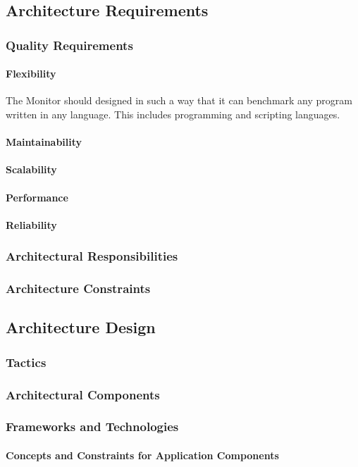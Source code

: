 
\subsection{Architecture Requirements}


\subsubsection{Quality Requirements}
\paragraph{Flexibility}
The Monitor should designed in such a way that it can benchmark any program
written in any language. This includes programming and scripting languages.

\paragraph{Maintainability}


\paragraph{Scalability}


\paragraph{Performance}


\paragraph{Reliability}


\subsubsection{Architectural Responsibilities}


\subsubsection{Architecture Constraints}


\subsection{Architecture Design}
\subsubsection{Tactics}

\subsubsection{Architectural Components}

\subsubsection{Frameworks and Technologies}

\paragraph{Concepts and Constraints for Application Components}
